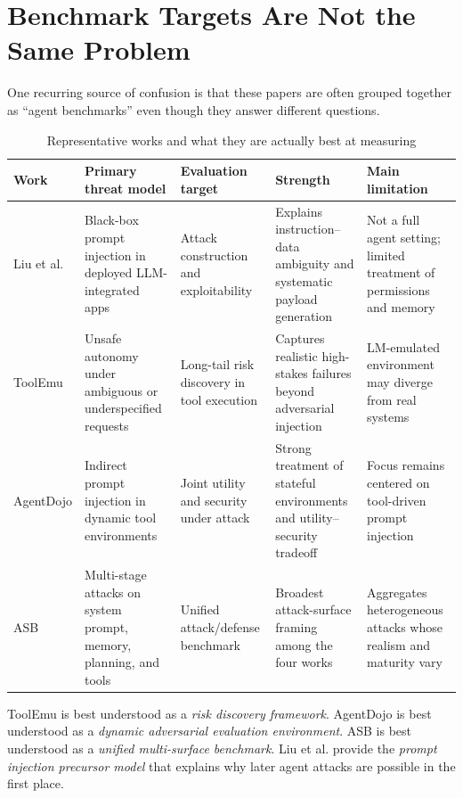 \documentclass[conference]{IEEEtran}
\begin{document}
\section{Benchmark Targets Are Not the Same Problem}

One recurring source of confusion is that these papers are often grouped together as ``agent benchmarks'' even though they answer different questions.

\begin{table}[t]
\caption{Representative works and what they are actually best at measuring}
\label{tab:comparison}
\centering
\begin{tabularx}{\textwidth}{>{\raggedright\arraybackslash}p{2.2cm} >{\raggedright\arraybackslash}p{2.6cm} >{\raggedright\arraybackslash}p{3.1cm} >{\raggedright\arraybackslash}X >{\raggedright\arraybackslash}p{3.0cm}}
\toprule
Work & Primary threat model & Evaluation target & Strength & Main limitation \\
\midrule
Liu et al. & Black-box prompt injection in deployed LLM-integrated apps & Attack construction and exploitability & Explains instruction--data ambiguity and systematic payload generation & Not a full agent setting; limited treatment of permissions and memory \\
\addlinespace
ToolEmu & Unsafe autonomy under ambiguous or underspecified requests & Long-tail risk discovery in tool execution & Captures realistic high-stakes failures beyond adversarial injection & LM-emulated environment may diverge from real systems \\
\addlinespace
AgentDojo & Indirect prompt injection in dynamic tool environments & Joint utility and security under attack & Strong treatment of stateful environments and utility--security tradeoff & Focus remains centered on tool-driven prompt injection \\
\addlinespace
ASB & Multi-stage attacks on system prompt, memory, planning, and tools & Unified attack/defense benchmark & Broadest attack-surface framing among the four works & Aggregates heterogeneous attacks whose realism and maturity vary \\
\bottomrule
\end{tabularx}
\end{table}

ToolEmu is best understood as a \emph{risk discovery framework}. AgentDojo is best understood as a \emph{dynamic adversarial evaluation environment}. ASB is best understood as a \emph{unified multi-surface benchmark}. Liu et al. provide the \emph{prompt injection precursor model} that explains why later agent attacks are possible in the first place.
\end{document}
